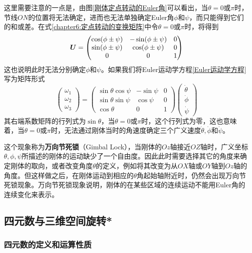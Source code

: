 这里需要注意的一点是，由图\ref{刚体定点转动的Euler角}可以看出，当$\theta=0\text{或}\pi$时，节线$ON$的位置将无法确定，进而也无法单独确定Euler角$\phi$和$\psi$，而只能得到它们的和或差。在式\eqref{chapter6:定点转动的变换矩阵}中令$\theta=0\text{或}\pi$时，将得到
\begin{equation*}
	\boldsymbol{U} = \begin{pmatrix}
		\cos(\phi\pm \psi) & -\sin(\phi\pm \psi) & 0 \\
		\sin(\phi\pm \psi) & \cos(\phi\pm \psi) & 0 \\
		0 & 0 & 1
	\end{pmatrix}
\end{equation*}
这也说明此时无法分别确定$\phi$和$\psi$。如果我们将Euler运动学方程\eqref{Euler运动学方程}写为矩阵形式
\begin{equation*}
	\begin{pmatrix}
		\omega_1 \\ \omega_2 \\ \omega_3
	\end{pmatrix} = \begin{pmatrix}
		\sin\theta\cos\psi & -\sin\psi & 0 \\
		\sin\theta\sin\psi & \cos\psi & 0 \\
		\cos\theta & 0 & 1
	\end{pmatrix} \begin{pmatrix} \dot{\theta} \\ \dot{\phi} \\ \dot{\psi} \end{pmatrix}
\end{equation*}
其右端系数矩阵的行列式为$\sin\theta$，当$\theta=0$或$\pi$时，这个行列式为零，这也意味着，当$\theta=0$或$\pi$时，无法通过刚体当时的角速度确定三个广义速度$\dot{\theta},\dot{\phi}$和$\dot{\psi}$。

这个现象称为{\bf 万向节死锁}（Gimbal Lock），当刚体的$Oz$轴接近$OZ$轴时，广义坐标$\theta,\phi,\psi$所描述的刚体的运动缺少了一个自由度。因此此时需要选择其它的角度来确定刚体的取向，或者改变角度$\theta$的定义，例如将其改变为从$OX$轴或$OY$轴到$Oz$轴的角度。但这样做之后，在刚体运动到相应的$\theta$角起始轴附近时，仍然会出现万向节死锁现象。万向节死锁现象说明，刚体的在某些区域的连续运动不能用Euler角的连续变化来表示。

\subsection{四元数与三维空间旋转*}

\subsubsection{四元数的定义和运算性质}

